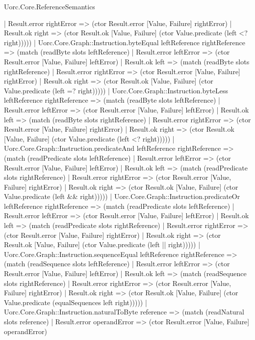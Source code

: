 \begin{lexlean}{Uorc.Core.ReferenceSemantics}
\begin{semanticmodule}
{        | Result.error rightError => (ctor Result.error [Value, Failure] rightError)
        | Result.ok right => (ctor Result.ok [Value, Failure] (ctor Value.predicate (left <? right)))))
    | Uorc.Core.Graph::Instruction.byteEqual leftReference rightReference => (match (readByte slots leftReference)
      | Result.error leftError => (ctor Result.error [Value, Failure] leftError)
      | Result.ok left => (match (readByte slots rightReference)
        | Result.error rightError => (ctor Result.error [Value, Failure] rightError)
        | Result.ok right => (ctor Result.ok [Value, Failure] (ctor Value.predicate (left =? right)))))
    | Uorc.Core.Graph::Instruction.byteLess leftReference rightReference => (match (readByte slots leftReference)
      | Result.error leftError => (ctor Result.error [Value, Failure] leftError)
      | Result.ok left => (match (readByte slots rightReference)
        | Result.error rightError => (ctor Result.error [Value, Failure] rightError)
        | Result.ok right => (ctor Result.ok [Value, Failure] (ctor Value.predicate (left <? right)))))
    | Uorc.Core.Graph::Instruction.predicateAnd leftReference rightReference => (match (readPredicate slots leftReference)
      | Result.error leftError => (ctor Result.error [Value, Failure] leftError)
      | Result.ok left => (match (readPredicate slots rightReference)
        | Result.error rightError => (ctor Result.error [Value, Failure] rightError)
        | Result.ok right => (ctor Result.ok [Value, Failure] (ctor Value.predicate (left && right)))))
    | Uorc.Core.Graph::Instruction.predicateOr leftReference rightReference => (match (readPredicate slots leftReference)
      | Result.error leftError => (ctor Result.error [Value, Failure] leftError)
      | Result.ok left => (match (readPredicate slots rightReference)
        | Result.error rightError => (ctor Result.error [Value, Failure] rightError)
        | Result.ok right => (ctor Result.ok [Value, Failure] (ctor Value.predicate (left || right)))))
    | Uorc.Core.Graph::Instruction.sequenceEqual leftReference rightReference => (match (readSequence slots leftReference)
      | Result.error leftError => (ctor Result.error [Value, Failure] leftError)
      | Result.ok left => (match (readSequence slots rightReference)
        | Result.error rightError => (ctor Result.error [Value, Failure] rightError)
        | Result.ok right => (ctor Result.ok [Value, Failure] (ctor Value.predicate (equalSequences left right)))))
    | Uorc.Core.Graph::Instruction.naturalToByte reference => (match (readNatural slots reference)
      | Result.error operandError => (ctor Result.error [Value, Failure] operandError)
}
\end{semanticmodule}
\end{lexlean}
